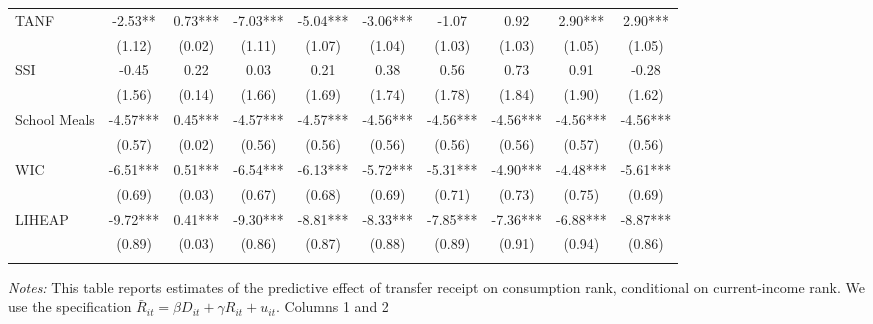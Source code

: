 \begin{table}[]
\begin{tabular*}{1.36\textwidth}{@{\extracolsep{\fill}}lccccccccc}
TANF               & -2.53**        & 0.73***        & -7.03***        & -5.04***        & -3.06***        & -1.07        & 0.92        & 2.90***        & 2.90*** \\
                   & (1.12)            & (0.02)            & (1.11)            & (1.07)            & (1.04)            & (1.03)            & (1.03)            & (1.05)            & (1.05)     \\
\addlinespace
SSI                & -0.45         & 0.22         & 0.03         & 0.21         & 0.38         & 0.56         & 0.73         & 0.91         & -0.28 \\
                   & (1.56)             & (0.14)             & (1.66)             & (1.69)             & (1.74)             & (1.78)             & (1.84)             & (1.90)             & (1.62)     \\
\addlinespace
School Meals       & -4.57*** & 0.45*** & -4.57*** & -4.57*** & -4.56*** & -4.56*** & -4.56*** & -4.56*** & -4.56*** \\
                   & (0.57)     & (0.02)     & (0.56)     & (0.56)     & (0.56)     & (0.56)     & (0.56)     & (0.57)     & (0.56)     \\
\addlinespace
WIC                & -6.51***         & 0.51***         & -6.54***         & -6.13***         & -5.72***         & -5.31***         & -4.90***         & -4.48***         & -5.61*** \\
                   & (0.69)             & (0.03)             & (0.67)             & (0.68)             & (0.69)             & (0.71)             & (0.73)             & (0.75)             & (0.69)     \\
\addlinespace
LIHEAP             & -9.72***      & 0.41***      & -9.30***      & -8.81***      & -8.33***      & -7.85***      & -7.36***      & -6.88***      & -8.87*** \\
                   & (0.89)          & (0.03)          & (0.86)          & (0.87)          & (0.88)          & (0.89)          & (0.91)          & (0.94)          & (0.86)     \\
\addlinespace
\bottomrule
\end{tabular*}
\begin{spacing}{1}
\begin{tablenotes}
\item \footnotesize \textit{Notes:} This table reports estimates of
  the predictive effect of transfer receipt on consumption rank,
  conditional on current-income rank. We use the specification
  $\bar{R}_{it}=\beta D_{it}+\gamma R_{it}+u_{it}$. Columns 1 and 2

\end{tablenotes}
\end{spacing}
\end{table}
